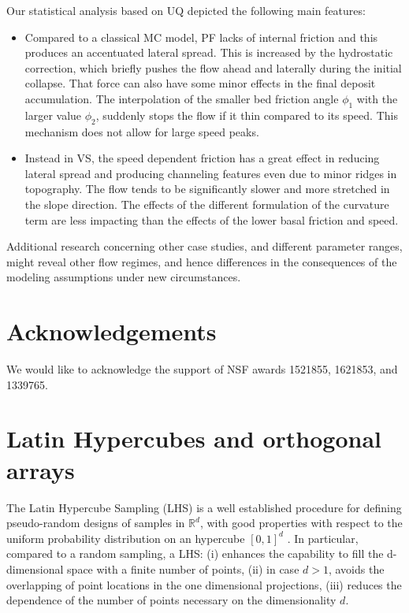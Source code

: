 \documentclass{article}
\begin{document}
Our statistical analysis based on UQ depicted the following main features:
\begin{itemize}
  \item Compared to a classical MC model, PF lacks of internal friction and this produces an accentuated lateral spread. This is increased by the hydrostatic correction, which briefly pushes the flow ahead and laterally during the initial collapse. That force can also have some minor effects in the final deposit accumulation. The interpolation of the smaller bed friction angle $\phi_1$ with the larger value $\phi_2$, suddenly stops the flow if it thin compared to its speed. This mechanism does not allow for large speed peaks.
  \item Instead in VS, the speed dependent friction has a great effect in reducing lateral spread and producing channeling features even due to minor ridges in topography. The flow tends to be significantly slower and more stretched in the slope direction. The effects of the different formulation of the curvature term are less impacting than the effects of the lower basal friction and speed.
\end{itemize}

Additional research concerning other case studies, and different parameter ranges, might reveal other flow regimes, and hence differences in the consequences of the modeling assumptions under new circumstances.

\section*{Acknowledgements}
We would like to acknowledge the support of NSF awards 1521855, 1621853, and 1339765.

\appendix
\section{Latin Hypercubes and orthogonal arrays}\label{A-1}
The Latin Hypercube Sampling (LHS) is a well established procedure for defining pseudo-random designs of samples in $\mathbb R^d$, with good properties with respect to the uniform probability distribution on an hypercube $[0,1]^d$ \citep{McKay1979,Owen1992b,Stein1987,Ranjan2014,Mingyao2016}. In particular, compared to a random sampling, a LHS: (i) enhances the capability to fill the d-dimensional space with a finite number of points, (ii) in case $d>1$, avoids the overlapping of point locations in the one dimensional projections, (iii) reduces the dependence of the number of points necessary on the dimensionality $d$.
\end{document}
